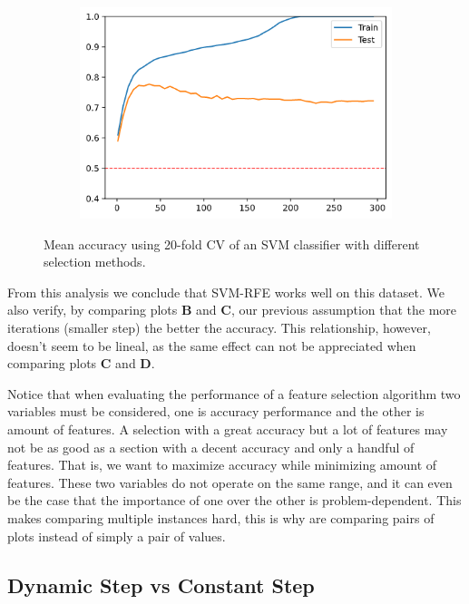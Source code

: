 \begin{figure}[H]
\begin{subfigure}[b]{0.4\linewidth}
    \end{subfigure}
    \begin{subfigure}[b]{0.4\linewidth}
        \includegraphics[width=\linewidth]{img/vanilla300-svmrfe.png}
    \end{subfigure}
    \caption{Mean accuracy using 20-fold CV of an SVM classifier with different selection methods.}
    \label{fig:dynamicStep.vanilla.comp}
\end{figure}

From this analysis we conclude that SVM-RFE works well on this dataset. We also verify, by comparing plots \textbf{B} and \textbf{C}, our previous assumption that the more iterations (smaller step) the better the accuracy. This relationship, however, doesn't seem to be lineal, as the same effect can not be appreciated when comparing plots \textbf{C} and \textbf{D}.

Notice that when evaluating the performance of a feature selection algorithm two variables must be considered, one is accuracy performance and the other is amount of features. A selection with a great accuracy but a lot of features may not be as good as a section with a decent accuracy and only a handful of features. That is, we want to maximize accuracy while minimizing amount of features. These two variables do not operate on the same range, and it can even be the case that the importance of one over the other is problem-dependent. This makes comparing multiple instances hard, this is why are comparing pairs of plots instead of simply a pair of values.

\subsection{Dynamic Step vs Constant Step}

